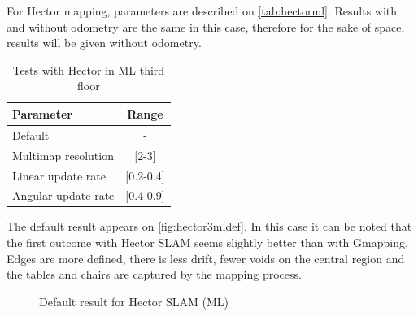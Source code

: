 \clearpage
{} For Hector mapping, parameters are described on \autoref{tab:hectorml}. Results with and without odometry are the same in this case, therefore for the sake of space, results will be given without odometry.
\begin{table}[h]
  \centering
  \begin{tabular}{lc}
  \hline
    \textbf{Parameter} & \textbf{Range} \\ \hline
    Default & - \\ \hline
    Multimap resolution & {[}2-3{]} \\ \hline
    Linear update rate & {[}0.2-0.4{]} \\ \hline
    Angular update rate & {[}0.4-0.9{]} \\ \hline
  \end{tabular}
  \caption{Tests with Hector in ML third floor}
  \label{tab:hectorml}
\end{table}

The default result appears on \autoref{fig:hector3mldef}. In this case it can be noted that the first outcome with Hector SLAM seems slightly better than with Gmapping. Edges are more defined, there is less drift, fewer voids on the central region and the tables and chairs are captured by the mapping process.
\begin{figure}[htb]
  \centering
  \caption{Default result for Hector SLAM (ML)}
  \label{fig:hector3mldef}
\end{figure}

